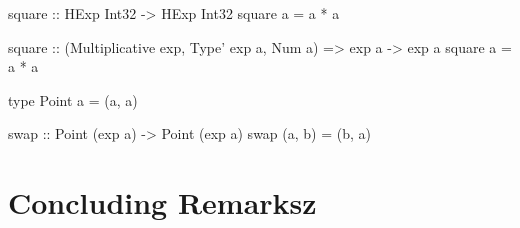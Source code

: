 \begin{stub}
square :: HExp Int32 -> HExp Int32
square a = a * a
\end{stub}

\lipsum[1]

\begin{stub}
square :: (Multiplicative exp, Type' exp a, Num a) => exp a -> exp a
square a = a * a
\end{stub}

\lipsum[1]

\begin{code}
type Point a = (a, a)

swap :: Point (exp a) -> Point (exp a)
swap (a, b) = (b, a)
\end{code}

\lipsum[1]

%
%

\chapter{Concluding Remarksz}
\label{ch:conc}

\lipsum[1]
